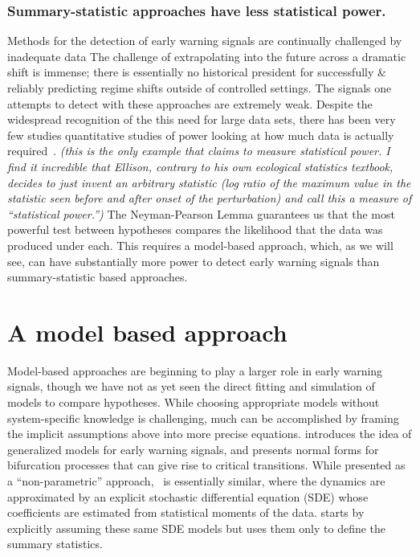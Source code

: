 \documentclass[authoryear,preprint,11pt]{elsarticle}
\newcommand{\cb}[1]{{\it \color{darkgreen} (#1)}}
\begin{document}
\subsubsection{Summary-statistic approaches have less statistical power.}
Methods for the detection of early warning signals are continually challenged by 
inadequate data  %
The challenge of extrapolating into the future across a dramatic shift is immense;
there is essentially no historical president for successfully \& reliably predicting regime shifts
outside of controlled settings. %
The signals one attempts to detect with these approaches are extremely weak.
Despite the widespread recognition of the this need for large data sets, 
there has been very few studies quantitative studies of power looking at how much data is actually required~\citep{Contamin2009}.
\cb{this is the only example that claims to measure statistical power.  I find it incredible that Ellison, contrary to his own ecological statistics textbook, decides to just invent an arbitrary statistic (log ratio of the maximum value in the statistic seen before and after onset of the perturbation) and call this a measure of ``statistical power.''}
The Neyman-Pearson Lemma guarantees us that the most powerful test between hypotheses compares the 
likelihood that the data was produced under each. This requires a model-based approach, which,
as we will see, can have substantially more power to detect early warning signals than summary-statistic based approaches.  


\section{A model based approach}
Model-based approaches are beginning to play a larger role in early warning signals, 
though we have not as yet seen the direct fitting and simulation of models to compare hypotheses.  
While choosing appropriate models without system-specific knowledge is challenging, 
much can be accomplished by framing the implicit assumptions above into more precise equations.
\citet{Lade2011} introduces the idea of generalized models for early warning signals, and 
\citet{Kuehn2011} presents normal forms for bifurcation processes that can give rise to critical transitions.  
While presented as a ``non-parametric'' approach,~\citet{Carpenter2011e} is essentially similar, where the dynamics are approximated 
by an explicit stochastic differential equation (SDE) whose coefficients are estimated from statistical moments of the data. \citet{Dakos2011a} starts by explicitly assuming these same SDE models but uses them only to define the summary statistics.  
\end{document}
